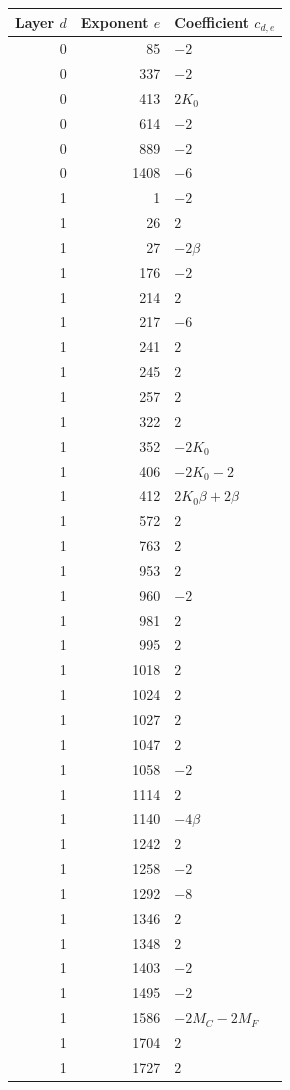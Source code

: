 \begin{longtable}{rrl}
\toprule Layer $d$ & Exponent $e$ & Coefficient $c_{d,e}$\\\midrule\endhead
0 & 85 & $-2$\\
0 & 337 & $-2$\\
0 & 413 & $2 K_{0}$\\
0 & 614 & $-2$\\
0 & 889 & $-2$\\
0 & 1408 & $-6$\\
1 & 1 & $-2$\\
1 & 26 & $2$\\
1 & 27 & $- 2 \beta$\\
1 & 176 & $-2$\\
1 & 214 & $2$\\
1 & 217 & $-6$\\
1 & 241 & $2$\\
1 & 245 & $2$\\
1 & 257 & $2$\\
1 & 322 & $2$\\
1 & 352 & $- 2 K_{0}$\\
1 & 406 & $- 2 K_{0} - 2$\\
1 & 412 & $2 K_{0} \beta + 2 \beta$\\
1 & 572 & $2$\\
1 & 763 & $2$\\
1 & 953 & $2$\\
1 & 960 & $-2$\\
1 & 981 & $2$\\
1 & 995 & $2$\\
1 & 1018 & $2$\\
1 & 1024 & $2$\\
1 & 1027 & $2$\\
1 & 1047 & $2$\\
1 & 1058 & $-2$\\
1 & 1114 & $2$\\
1 & 1140 & $- 4 \beta$\\
1 & 1242 & $2$\\
1 & 1258 & $-2$\\
1 & 1292 & $-8$\\
1 & 1346 & $2$\\
1 & 1348 & $2$\\
1 & 1403 & $-2$\\
1 & 1495 & $-2$\\
1 & 1586 & $- 2 M_{C} - 2 M_{F}$\\
1 & 1704 & $2$\\
1 & 1727 & $2$\\

\end{longtable}
